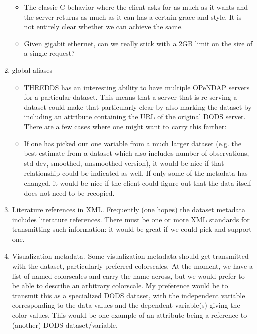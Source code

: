 \begin{enumerate}
\begin{itemize}
     \item The classic C-behavior where the client asks for as much as
       it wants and the server returns as much as it can has a certain
       grace-and-style.  It is not entirely clear whether we can achieve the
       same.

        \item Given gigabit ethernet, can we really stick with a 2GB 
          limit on the size of a single request? 
      \end{itemize}

  \item global aliases
     \begin{itemize}
       
     \item THREDDS has an interesting ability to have multiple OPeNDAP
       servers for a particular dataset. This means that a server that
       is re-serving a dataset could make that particularly clear by
       also marking the dataset by including an attribute containing
       the URL of the original DODS server. There are a few cases
       where one might want to carry this farther:
       
     \item If one has picked out one variable from a much larger
       dataset (e.g. the best-estimate from a dataset which also
       includes number-of-observations, std-dev, smoothed, unsmoothed
       version), it would be nice if that relationship could be
       indicated as well. If only some of the metadata has changed, it
       would be nice if the client could figure out that the data
       itself does not need to be recopied.
     \end{itemize}
     
   \item Literature references in XML.  Frequently (one hopes) the
     dataset metadata includes literature references. There must be
     one or more XML standards for transmitting such information: it
     would be great if we could pick and support one.
     
   \item Visualization metadata.  Some visualization metadata should
     get transmitted with the dataset, particularly preferred
     colorscales. At the moment, we have a list of named colorscales
     and carry the name across, but we would prefer to be able to
     describe an arbitrary colorscale.  My preference would be to
     transmit this as a specialized DODS dataset, with the independent
     variable corresponding to the data values and the dependent
     variable(s) giving the color values. This would be one example of
     an attribute being a reference to (another) DODS
     dataset/variable.


\end{enumerate}
